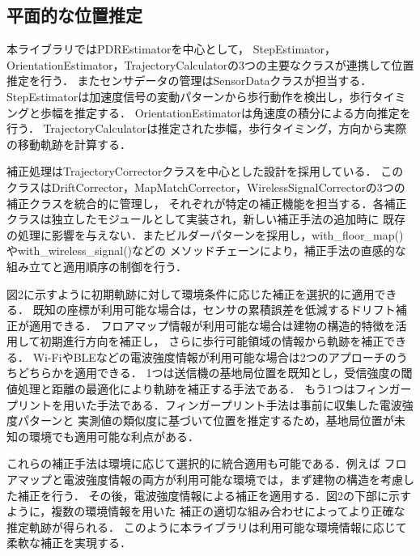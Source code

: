 \documentclass[a4paper, 10pt, twocolumn]{jarticle}
\begin{document}
\subsection{平面的な位置推定}
本ライブラリではPDREstimatorを中心として，
StepEstimator，OrientationEstimator，TrajectoryCalculatorの3つの主要なクラスが連携して位置推定を行う．
またセンサデータの管理はSensorDataクラスが担当する．
StepEstimatorは加速度信号の変動パターンから歩行動作を検出し，歩行タイミングと歩幅を推定する．
OrientationEstimatorは角速度の積分による方向推定を行う．
TrajectoryCalculatorは推定された歩幅，歩行タイミング，方向から実際の移動軌跡を計算する．

補正処理はTrajectoryCorrectorクラスを中心とした設計を採用している．
このクラスはDriftCorrector，MapMatchCorrector，WirelessSignalCorrectorの3つの補正クラスを統合的に管理し，
それぞれが特定の補正機能を担当する．各補正クラスは独立したモジュールとして実装され，新しい補正手法の追加時に
既存の処理に影響を与えない．またビルダーパターンを採用し，with\_floor\_map()やwith\_wireless\_signal()などの
メソッドチェーンにより，補正手法の直感的な組み立てと適用順序の制御を行う．

図2に示すように初期軌跡に対して環境条件に応じた補正を選択的に適用できる．
既知の座標が利用可能な場合は，センサの累積誤差を低減するドリフト補正が適用できる．
フロアマップ情報が利用可能な場合は建物の構造的特徴を活用して初期進行方向を補正し，
さらに歩行可能領域の情報から軌跡を補正できる．
Wi-FiやBLEなどの電波強度情報が利用可能な場合は2つのアプローチのうちどちらかを適用できる．
1つは送信機の基地局位置を既知とし，受信強度の閾値処理と距離の最適化により軌跡を補正する手法である．
もう1つはフィンガープリントを用いた手法である．フィンガープリント手法は事前に収集した電波強度パターンと
実測値の類似度に基づいて位置を推定するため，基地局位置が未知の環境でも適用可能な利点がある．


これらの補正手法は環境に応じて選択的に統合適用も可能である．例えば
フロアマップと電波強度情報の両方が利用可能な環境では，まず建物の構造を考慮した補正を行う．
その後，電波強度情報による補正を適用する．図2の下部に示すように，複数の環境情報を用いた
補正の適切な組み合わせによってより正確な推定軌跡が得られる．
このように本ライブラリは利用可能な環境情報に応じて柔軟な補正を実現する．%
\end{document}
